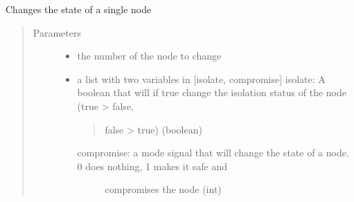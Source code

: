 \documentclass[letterpaper,10pt,english]{sphinxmanual}
\begin{document}
\begin{fulllineitems}
\begin{fulllineitems}
\end{fulllineitems}


\begin{fulllineitems}
\label{\detokenize{source/yawning_titan.envs.specific.core:yawning_titan.envs.specific.core.nsa_node_collection.NodeCollection.modify_node}}
\sphinxAtStartPar
Changes the state of a single node
\begin{quote}\begin{description}
\item[{Parameters}] \leavevmode\begin{itemize}
\item {}
\sphinxAtStartPar
{} \textendash{} the number of the node to change

\item {}
\sphinxAtStartPar
{} \textendash{}
\sphinxAtStartPar
a list with two variables in {[}isolate, compromise{]}
isolate: A boolean that will if true change the isolation status of the node (true \sphinxhyphen{}\textgreater{} false,
\begin{quote}

\sphinxAtStartPar
false \sphinxhyphen{}\textgreater{} true) (boolean)
\end{quote}
\begin{description}
\item[{compromise: a mode signal that will change the state of a node. 0 does nothing, 1 makes it safe and}] \leavevmode
{} compromises the node (int)

\end{description}


\end{itemize}

\end{description}\end{quote}

\end{fulllineitems}


\end{fulllineitems}
\end{document}
